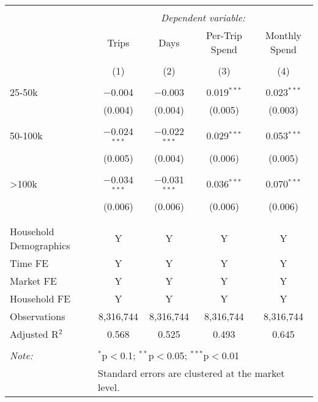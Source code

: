 
\begin{table}[!htbp] \centering 
  \caption{} 
  \label{} 
\begin{tabular}{@{\extracolsep{5pt}}lcccc} 
\\[-1.8ex]\hline 
\hline \\[-1.8ex] 
 & \multicolumn{4}{c}{\textit{Dependent variable:}} \\ 
\cline{2-5} 
 & Trips & Days & Per-Trip Spend & Monthly Spend \\ 
\\[-1.8ex] & (1) & (2) & (3) & (4)\\ 
\hline \\[-1.8ex] 
 25-50k & $-$0.004 & $-$0.003 & 0.019$^{***}$ & 0.023$^{***}$ \\ 
  & (0.004) & (0.004) & (0.005) & (0.003) \\ 
  & & & & \\ 
 50-100k & $-$0.024$^{***}$ & $-$0.022$^{***}$ & 0.029$^{***}$ & 0.053$^{***}$ \\ 
  & (0.005) & (0.004) & (0.006) & (0.005) \\ 
  & & & & \\ 
 >100k & $-$0.034$^{***}$ & $-$0.031$^{***}$ & 0.036$^{***}$ & 0.070$^{***}$ \\ 
  & (0.006) & (0.006) & (0.006) & (0.006) \\ 
  & & & & \\ 
\hline \\[-1.8ex] 
Household Demographics & Y & Y & Y & Y \\ 
Time FE & Y & Y & Y & Y \\ 
Market FE & Y & Y & Y & Y \\ 
Household FE & Y & Y & Y & Y \\ 
Observations & 8,316,744 & 8,316,744 & 8,316,744 & 8,316,744 \\ 
Adjusted R$^{2}$ & 0.568 & 0.525 & 0.493 & 0.645 \\ 
\hline 
\hline \\[-1.8ex] 
\textit{Note:}  & \multicolumn{4}{l}{$^{*}$p$<$0.1; $^{**}$p$<$0.05; $^{***}$p$<$0.01} \\ 
 & \multicolumn{4}{l}{Standard errors are clustered at the market level.} \\ 
\end{tabular} 
\end{table} 
